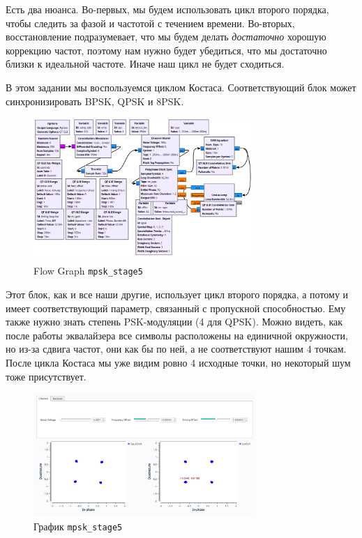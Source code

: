\documentclass[a4paper,12pt]{report}
\begin{document}
    Есть два нюанса. Во-первых, мы будем использовать цикл второго порядка, чтобы следить за фазой и частотой с течением времени. Во-вторых, восстановление подразумевает, что мы будем делать \emph{достаточно} хорошую коррекцию частот, поэтому нам нужно будет убедиться, что мы достаточно близки к идеальной частоте. Иначе наш цикл не будет сходиться.
    
    В этом задании мы воспользуемся циклом Костаса. Соответствующий блок может синхронизировать BPSK, QPSK и 8PSK.
    
    \begin{figure}[H]
        \centering
        \includegraphics[width=0.75\textwidth]{images/mpsk_stage5_fg.png}
        \caption{Flow Graph \texttt{mpsk\_stage5}}
        \label{fig:mpsk_stage5_fg}
    \end{figure}
    
    Этот блок, как и все наши другие, использует цикл второго порядка, а потому и имеет соответствующий параметр, связанный с пропускной способностью. Ему также нужно знать степень PSK-модуляции (4 для QPSK). Можно видеть, как после работы эквалайзера все символы расположены на единичной окружности, но из-за сдвига частот, они как бы  по ней, а не соответствуют нашим 4 точкам. После цикла Костаса мы уже видим ровно 4 исходные точки, но некоторый шум тоже присутствует.
    
    \begin{figure}[H]
        \centering
        \includegraphics[width=0.75\textwidth]{images/mpsk_stage5_plot.png}
        \caption{График \texttt{mpsk\_stage5}}
        \label{fig:mpsk_stage5_plot}
    \end{figure}
    
\end{document}
